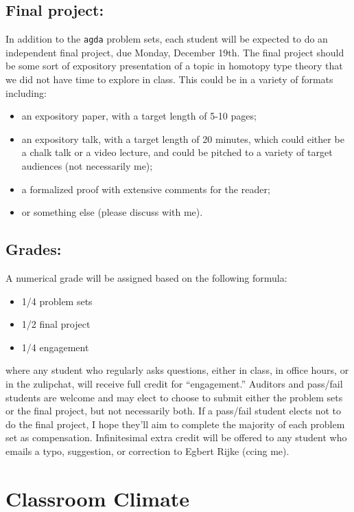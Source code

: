 \documentclass{amsart}
\theoremstyle{definition}
\theoremstyle{remark}
\numberwithin{equation}{section}
\begin{document}
\subsection*{Final project:}
In addition to the \texttt{agda} problem sets, each student will be expected to do an independent final project, due Monday, December 19th. The final project should be some sort of expository presentation of a topic in homotopy type theory that we did not have time to explore in class. This could be in a variety of formats including:
\begin{itemize}
\item an expository paper, with a target length of 5-10 pages;
\item an expository talk, with a target length of 20 minutes, which could either be a chalk talk or a video lecture, and could be pitched to a variety of target audiences (not necessarily me);
\item a formalized proof with extensive comments for the reader;
\item or something else (please discuss with me).
\end{itemize}

\subsection*{Grades:}
A numerical grade will be assigned based on the following formula:
\begin{itemize}
\item 1/4 problem sets
\item 1/2 final project
\item 1/4 engagement
\end{itemize}
where any student who regularly asks questions, either in class, in office hours, or in the zulipchat, will receive full credit for ``engagement.'' Auditors and pass/fail students are welcome and may elect to choose to submit either the problem sets or the final project, but not necessarily both. If a pass/fail student elects not to do the final project, I hope they'll aim to complete the majority of each problem set as compensation. Infinitesimal extra credit will be offered to any student who emails a typo, suggestion, or correction to Egbert Rijke (ccing me).


\section*{Classroom Climate}
\end{document}
